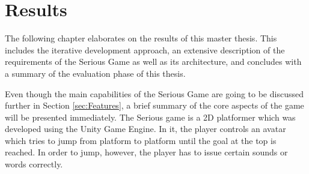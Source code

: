 \documentclass[draft,final]{vutinfth} %
\begin{document}
\chapter{Results}
\label{chap:results}
The following chapter elaborates on the results of this master thesis. This includes the iterative development approach, an extensive description of the requirements of the Serious Game as well as its architecture, and concludes with a summary of the evaluation phase of this thesis.

Even though the main capabilities of the Serious Game are going to be discussed further in Section \ref{sec:Features}, a brief summary of the core aspects of the game will be presented immediately. The Serious game is a 2D platformer which was developed using the Unity Game Engine. In it, the player controls an avatar which tries to jump from platform to platform until the goal at the top is reached. In order to jump, however, the player has to issue certain sounds or words correctly.
\end{document}
